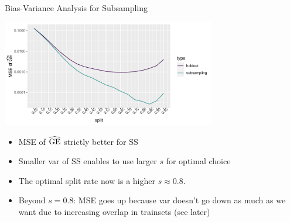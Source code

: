 \documentclass[11pt,compress,t,notes=noshow, xcolor=table]{beamer}
\begin{document}
\begin{vbframe}{Bias-Variance Analysis for Subsampling}

\begin{center}
\includegraphics[width=0.7\textwidth]{figure/eval-resampling-example-2}
\end{center}

\begin{itemize}
  \item MSE of $\widehat{\mathrm{GE}}$ strictly better for SS
  \item Smaller var of SS enables to use larger $s$ for optimal choice
  \item The optimal split rate now is a higher $s \approx 0.8$.
  \item Beyond $s=0.8$: MSE goes up because var doesn't go down as much as we want 
      due to increasing overlap in trainsets (see later)
\end{itemize}

\end{vbframe}




\end{document}
